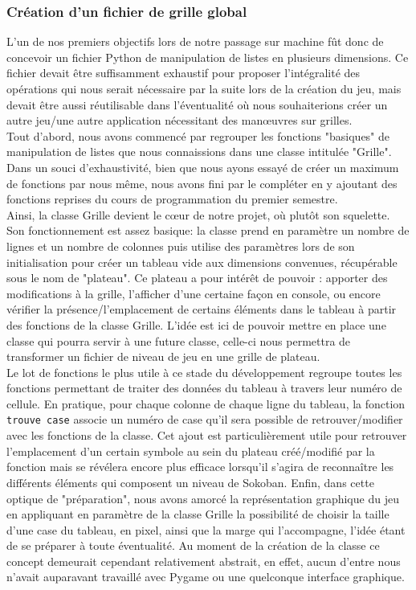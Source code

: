 \documentclass[a4paper,12pt]{article} %
\begin{document}
\subsubsection{Création d'un fichier de grille global}

L'un de nos premiers objectifs lors de notre passage sur machine fût donc de concevoir un fichier Python de manipulation de listes en plusieurs dimensions. Ce fichier devait être suffisamment exhaustif pour proposer l'intégralité des opérations qui nous serait nécessaire par la suite lors de la création du jeu, mais devait être aussi réutilisable dans l'éventualité où nous souhaiterions créer un autre jeu/une autre application nécessitant des manœuvres sur grilles. 
\\
Tout d'abord, nous avons commencé par regrouper les fonctions "basiques" de manipulation de listes que nous connaissions dans une classe intitulée "Grille". Dans un souci d’exhaustivité, bien que nous ayons essayé de créer un maximum de fonctions par nous même, nous avons fini par le compléter en y ajoutant des fonctions reprises du cours de programmation du premier semestre.
\\
Ainsi, la classe Grille devient le cœur de notre projet, où plutôt son squelette. Son fonctionnement est assez basique: la classe prend en paramètre un nombre de lignes et un nombre de colonnes puis utilise des paramètres lors de son initialisation pour créer un tableau vide aux dimensions convenues, récupérable sous le nom de "plateau". Ce plateau a pour intérêt de pouvoir : apporter des modifications à la grille, l'afficher d'une certaine façon en console, ou encore vérifier la présence/l'emplacement de certains éléments dans le tableau à partir des fonctions de la classe Grille. L'idée est ici de pouvoir mettre en place une classe qui pourra servir à une future classe, celle-ci nous permettra de transformer un fichier de niveau de jeu en une grille de plateau.
\\
Le lot de fonctions le plus utile à ce stade du développement regroupe toutes les fonctions permettant de traiter des données du tableau à travers leur numéro de cellule. En pratique, pour chaque colonne de chaque ligne du tableau, la fonction \texttt{trouve case} associe un numéro de case qu'il sera possible de retrouver/modifier avec les fonctions de la classe. Cet ajout est particulièrement utile pour retrouver l'emplacement d'un certain symbole au sein du plateau créé/modifié par la fonction mais se révélera encore plus efficace lorsqu'il s'agira de reconnaître les différents éléments qui composent un niveau de Sokoban.
\newpage
Enfin, dans cette optique de "préparation", nous avons amorcé la représentation graphique du jeu en appliquant en paramètre de la classe Grille la possibilité de choisir la taille d'une case du tableau, en pixel, ainsi que la marge qui l'accompagne, l'idée étant de se préparer à toute éventualité. Au moment de la création de la classe ce concept demeurait cependant relativement abstrait, en effet, aucun d'entre nous n'avait auparavant travaillé avec Pygame ou une quelconque interface graphique. 
\end{document}
